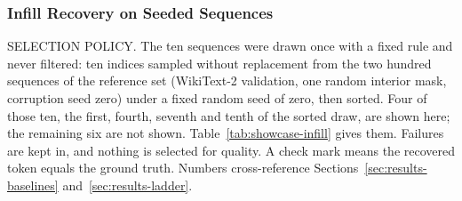 
\subsubsection{Infill Recovery on Seeded Sequences}
\label{app:showcase-infill}
SELECTION POLICY. The ten sequences were drawn once with a fixed rule and never filtered: ten indices sampled without replacement from the two hundred sequences of the reference set (WikiText-2 validation, one random interior mask, corruption seed zero) under a fixed random seed of zero, then sorted. Four of those ten, the first, fourth, seventh and tenth of the sorted draw, are shown here; the remaining six are not shown. Table~\ref{tab:showcase-infill} gives them. Failures are kept in, and nothing is selected for quality. A check mark means the recovered token equals the ground truth. Numbers cross-reference Sections~\ref{sec:results-baselines} and~\ref{sec:results-ladder}.

